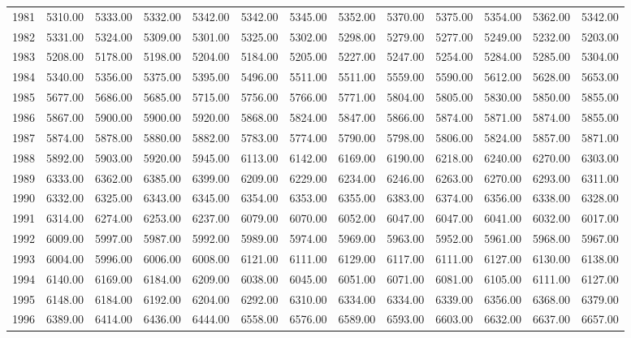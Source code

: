 \begin{longtable}{rrrrrrrrrrrrr}
  1981 & 5310.00 & 5333.00 & 5332.00 & 5342.00 & 5342.00 & 5345.00 & 5352.00 & 5370.00 & 5375.00 & 5354.00 & 5362.00 & 5342.00 \\ 
  1982 & 5331.00 & 5324.00 & 5309.00 & 5301.00 & 5325.00 & 5302.00 & 5298.00 & 5279.00 & 5277.00 & 5249.00 & 5232.00 & 5203.00 \\ 
  1983 & 5208.00 & 5178.00 & 5198.00 & 5204.00 & 5184.00 & 5205.00 & 5227.00 & 5247.00 & 5254.00 & 5284.00 & 5285.00 & 5304.00 \\ 
  1984 & 5340.00 & 5356.00 & 5375.00 & 5395.00 & 5496.00 & 5511.00 & 5511.00 & 5559.00 & 5590.00 & 5612.00 & 5628.00 & 5653.00 \\ 
  1985 & 5677.00 & 5686.00 & 5685.00 & 5715.00 & 5756.00 & 5766.00 & 5771.00 & 5804.00 & 5805.00 & 5830.00 & 5850.00 & 5855.00 \\ 
  1986 & 5867.00 & 5900.00 & 5900.00 & 5920.00 & 5868.00 & 5824.00 & 5847.00 & 5866.00 & 5874.00 & 5871.00 & 5874.00 & 5855.00 \\ 
  1987 & 5874.00 & 5878.00 & 5880.00 & 5882.00 & 5783.00 & 5774.00 & 5790.00 & 5798.00 & 5806.00 & 5824.00 & 5857.00 & 5871.00 \\ 
  1988 & 5892.00 & 5903.00 & 5920.00 & 5945.00 & 6113.00 & 6142.00 & 6169.00 & 6190.00 & 6218.00 & 6240.00 & 6270.00 & 6303.00 \\ 
  1989 & 6333.00 & 6362.00 & 6385.00 & 6399.00 & 6209.00 & 6229.00 & 6234.00 & 6246.00 & 6263.00 & 6270.00 & 6293.00 & 6311.00 \\ 
  1990 & 6332.00 & 6325.00 & 6343.00 & 6345.00 & 6354.00 & 6353.00 & 6355.00 & 6383.00 & 6374.00 & 6356.00 & 6338.00 & 6328.00 \\ 
  1991 & 6314.00 & 6274.00 & 6253.00 & 6237.00 & 6079.00 & 6070.00 & 6052.00 & 6047.00 & 6047.00 & 6041.00 & 6032.00 & 6017.00 \\ 
  1992 & 6009.00 & 5997.00 & 5987.00 & 5992.00 & 5989.00 & 5974.00 & 5969.00 & 5963.00 & 5952.00 & 5961.00 & 5968.00 & 5967.00 \\ 
  1993 & 6004.00 & 5996.00 & 6006.00 & 6008.00 & 6121.00 & 6111.00 & 6129.00 & 6117.00 & 6111.00 & 6127.00 & 6130.00 & 6138.00 \\ 
  1994 & 6140.00 & 6169.00 & 6184.00 & 6209.00 & 6038.00 & 6045.00 & 6051.00 & 6071.00 & 6081.00 & 6105.00 & 6111.00 & 6127.00 \\ 
  1995 & 6148.00 & 6184.00 & 6192.00 & 6204.00 & 6292.00 & 6310.00 & 6334.00 & 6334.00 & 6339.00 & 6356.00 & 6368.00 & 6379.00 \\ 
  1996 & 6389.00 & 6414.00 & 6436.00 & 6444.00 & 6558.00 & 6576.00 & 6589.00 & 6593.00 & 6603.00 & 6632.00 & 6637.00 & 6657.00 \\ 

\end{longtable}
